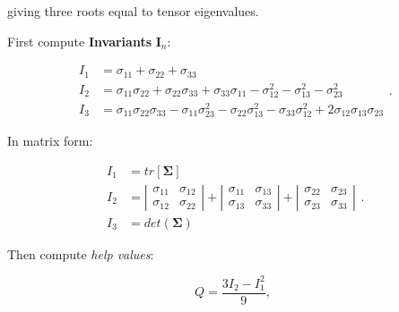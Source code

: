 \begin{itemize}
        giving three roots equal to tensor eigenvalues.

        First compute \textbf{Invariants} $\mathbf{I}_{n}$:

        \begin{equation}
            \begin{array}{ll}
                I_{1} &= \sigma_{11} + \sigma_{22} + \sigma_{33} \\
                I_{2} &= \sigma_{11}\sigma_{22} + \sigma_{22}\sigma_{33}
                + \sigma_{33}\sigma_{11} - \sigma_{12}^{2} - \sigma_{13}^{2} - \sigma_{23}^{2} \\
                I_{3}
                &= \sigma_{11}\sigma_{22}\sigma_{33}
                - \sigma_{11}\sigma_{23}^{2}
                - \sigma_{22}\sigma_{13}^{2}
                - \sigma_{33}\sigma_{12}^{2}
                + 2 \sigma_{12}\sigma_{13}\sigma_{23}
            \end{array}
        .\end{equation}

        In matrix form:

        \begin{equation}
            \begin{array}{ll}
                I_{1} &= tr[\mathbf{\Sigma}] \\
                I_{2} &= \left| \begin{matrix}
                    \sigma_{11} & \sigma_{12} \\
                    \sigma_{12} & \sigma_{22}
                \end{matrix} \right| + \left| \begin{matrix}
                    \sigma_{11} & \sigma_{13} \\
                    \sigma_{13} & \sigma_{33}
                \end{matrix} \right| + \left| \begin{matrix}
                    \sigma_{22} & \sigma_{23} \\
                    \sigma_{23} & \sigma_{33}
                \end{matrix} \right| \\
                    I_{3} &= det(\mathbf{\Sigma})
            \end{array}
        .\end{equation}

        Then compute \textit{help values}:

        \begin{equation}
            Q = \frac{3 I_{2} - I_{1}^{2}}{9}
        ,\end{equation}


\end{itemize}
